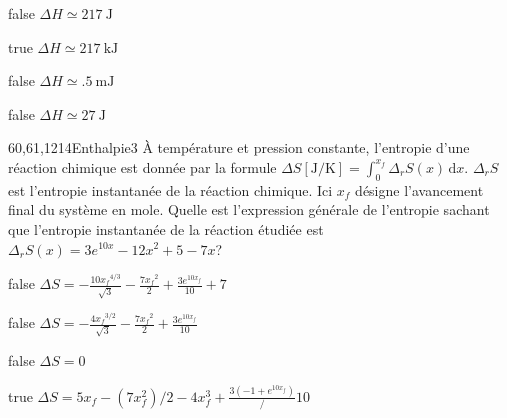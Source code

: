 		\begin{reponses}
			\item[false] $\Delta H \simeq \SI{217}{\joule}$
			\item[true] $\Delta H \simeq \SI{217}{\kilo\joule}$
			\item[false] $\Delta H \simeq \SI{.5}{\milli\joule}$
			\item[false] $\Delta H \simeq \SI{27}{\joule}$
		\end{reponses}
		\begin{question}{60,61,1214}{Enthalpie}{3}{}
			À température et pression constante, l'entropie d'une réaction chimique est donnée par la formule $\displaystyle \Delta S[\si{\joule\per\kelvin}] = \int^{x_f}_{0}\Delta_r S(x)\, \mathrm{d}x$. $\Delta_r S$ est l'entropie instantanée de la réaction chimique. Ici $x_f$ désigne l'avancement final du système en mole. Quelle est l'expression générale de l'entropie sachant que l'entropie instantanée de la réaction étudiée est $\Delta_r S(x) = 3e^{10x}-12x^2+5-7x$?
		\end{question}
		\begin{reponses}
			\item[false] $\displaystyle\Delta S = -\frac{10 {x_f}^{4/3}}{\sqrt{3}}-\frac{7 {x_f}^2}{2}+\frac{3 e^{10 {x_f}}}{10}+7$
			\item[false] $\displaystyle\Delta S = -\frac{4 {x_f}^{3/2}}{\sqrt{3}}-\frac{7 {x_f}^2}{2}+\frac{3 e^{10 {x_f}}}{10}$
			\item[false] $\displaystyle\Delta S = 0$
			\item[true] $\displaystyle\Delta S = 5 x_f - (7 x_f^2)/2 - 4 x_f^3 + \frac{3 (-1 + e^{10 {x_f}})}/{10}$
		\end{reponses}
